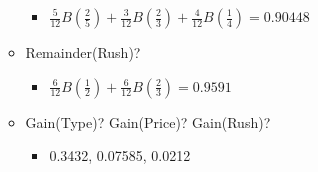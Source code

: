 \documentclass[compress, 9pt]{beamer}
\begin{document}
\begin{frame}
\begin{itemize}
\begin{itemize}
\begin{itemize}
\item <5->  $\frac{5}{12}B(\frac{2}{5}) + \frac{3}{12}B(\frac{2}{3})+\frac{4}{12}B(\frac{1}{4}) = 0.90448$
\label{sec-2-3-1-2-1}%
\end{itemize} %

\item <5-> Remainder(Rush)?
\label{sec-2-3-1-3}%
\begin{itemize}

\item <6-> $\frac{6}{12}B(\frac{1}{2}) + \frac{6}{12}B(\frac{2}{3}) = 0.9591$
\label{sec-2-3-1-3-1}%
\end{itemize} %

\item <7-> Gain(Type)? Gain(Price)? Gain(Rush)?
\label{sec-2-3-1-4}%
\begin{itemize}

\item <8-> 0.3432, 0.07585, 0.0212
\label{sec-2-3-1-4-1}%
\end{itemize} %
\end{itemize} %
\end{itemize} %
\end{frame}
\end{document}
